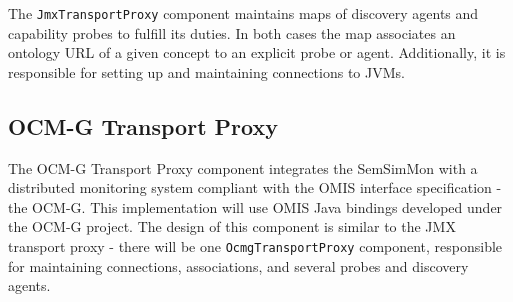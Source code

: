 The \texttt{JmxTransportProxy} component maintains maps of discovery agents and capability probes to fulfill its duties. In both cases the map associates an ontology URL of a given concept to an explicit probe or agent. Additionally, it is responsible for setting up and maintaining  connections to JVMs.

\subsection{OCM-G Transport Proxy}

The OCM-G Transport Proxy component integrates the SemSimMon with a distributed monitoring system compliant with the OMIS interface specification - the OCM-G. This implementation will use OMIS Java bindings developed under the OCM-G project. The design of this component is similar to the JMX transport proxy - there will be one \texttt{OcmgTransportProxy} component, responsible for maintaining connections, associations, and several probes and discovery agents.
